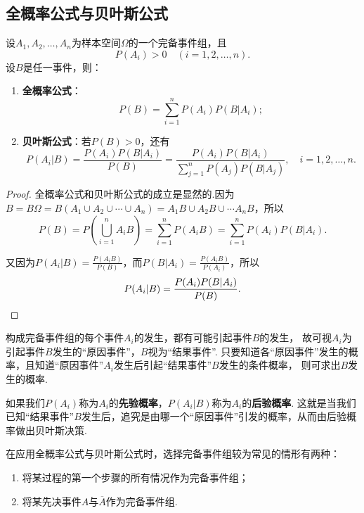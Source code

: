 \subsection{全概率公式与贝叶斯公式}
\begin{theorem}
设\(A_1,A_2,\dotsc,A_n\)为样本空间\(\Omega\)的一个完备事件组，且\[
P(A_i) > 0 \quad(i=1,2,\dotsc,n).
\]设\(B\)是任一事件，则：
\begin{enumerate}
\item \textbf{全概率公式}：\begin{equation}
P(B) = \sum\limits_{i=1}^{n} P(A_i) P(B \vert A_i);
\end{equation}
\item \textbf{贝叶斯公式}：若\(P(B) > 0\)，还有\begin{equation}
P(A_i \vert B) = \frac{P(A_i) P(B \vert A_i)}{P(B)}
= \frac{P(A_i) P(B \vert A_i)}{\sum\limits_{j=1}^n P(A_j) P(B \vert A_j)},
\quad i = 1,2,\dotsc,n.
\end{equation}
\end{enumerate}
\begin{proof}
全概率公式和贝叶斯公式的成立是显然的.因为\(B = B \Omega = B(A_1 \cup A_2 \cup \dotsb \cup A_n) = A_1 B \cup A_2 B \cup \dotsb A_n B\)，所以\[
P(B) = P\left(\bigcup\limits_{i=1}^n A_i B\right)
= \sum\limits_{i=1}^n P(A_i B)
= \sum\limits_{i=1}^n P(A_i) P(B \vert A_i).
\]

又因为\(P(A_i \vert B) = \frac{P(A_i B)}{P(B)}\)，而\(P(B \vert A_i) = \frac{P(A_i B)}{P(A_i)}\)，所以\[
P(A_i \vert B) = \frac{P(A_i) P(B \vert A_i)}{P(B)}.
\qedhere
\]
\end{proof}
\end{theorem}

构成完备事件组的每个事件\(A_i\)的发生，都有可能引起事件\(B\)的发生，%
故可视\(A_i\)为引起事件\(B\)发生的“原因事件”，\(B\)视为“结果事件”.
只要知道各“原因事件”发生的概率，且知道“原因事件”\(A_i\)发生后引起“结果事件”\(B\)发生的条件概率，%
则可求出\(B\)发生的概率.

如果我们\(P(A_i)\)称为\(A_i\)的\textbf{先验概率}，\(P(A_i \vert B)\)称为\(A_i\)的\textbf{后验概率}.
这就是当我们已知“结果事件”\(B\)发生后，追究是由哪一个“原因事件”引发的概率，从而由后验概率做出贝叶斯决策.

在应用全概率公式与贝叶斯公式时，选择完备事件组较为常见的情形有两种：
\begin{enumerate}
\item 将某过程的第一个步骤的所有情况作为完备事件组；
\item 将某先决事件\(A\)与\(\overline{A}\)作为完备事件组.
\end{enumerate}

